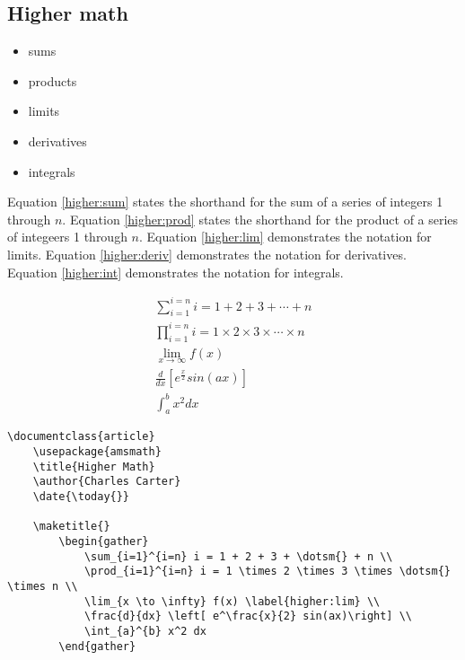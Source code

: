         \subsection{Higher math}
        \label{Higher math}
        
        \begin{cmd}
            \begin{itemize}
                \item{sums}
                \item{products}
                \item{limits}
                \item{derivatives}
                \item{integrals}
            \end{itemize}
        \end{cmd}

		Equation \ref{higher:sum} states the shorthand for the sum of a series of integers 1 through $n$. Equation \ref{higher:prod} states the shorthand for the product of a series of integeers 1 through $n$. Equation \ref{higher:lim} demonstrates the notation for limits. Equation \ref{higher:deriv} demonstrates the notation for derivatives. Equation \ref{higher:int} demonstrates the notation for integrals.

        \begin{sample}
		\begin{gather}
			\sum_{i=1}^{i=n} i = 1 + 2 + 3 + \dotsm{} + n \label{higher:sum} \\
			\prod_{i=1}^{i=n} i = 1 \times 2 \times 3 \times \dotsm{} \times n \label{higher:prod} \\
			\lim_{x \to \infty} f(x) \label{higher:lim} \\
			\frac{d}{dx} \left[ e^\frac{x}{2} sin(ax)\right] \label{higher:deriv} \\
			\int_{a}^{b} x^2 dx \label{higher:int}
		\end{gather}
        \end{sample}
		

        \begin{verbatim}
\documentclass{article}
    \usepackage{amsmath}
    \title{Higher Math}
    \author{Charles Carter}
    \date{\today{}}
 
    \maketitle{}
		\begin{gather}
			\sum_{i=1}^{i=n} i = 1 + 2 + 3 + \dotsm{} + n \\
			\prod_{i=1}^{i=n} i = 1 \times 2 \times 3 \times \dotsm{} \times n \\
			\lim_{x \to \infty} f(x) \label{higher:lim} \\
			\frac{d}{dx} \left[ e^\frac{x}{2} sin(ax)\right] \\
			\int_{a}^{b} x^2 dx
		\end{gather}
    
        \end{verbatim}

